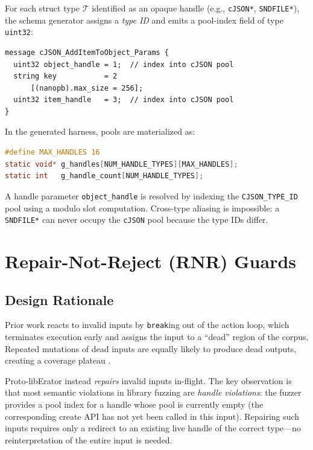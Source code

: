 \documentclass[sigconf,anonymous]{acmart}
\begin{document}
For each struct type $\mathcal{T}$ identified as an opaque handle
(e.g., \texttt{cJSON*}, \texttt{SNDFILE*}), the schema generator
assigns a \emph{type ID} and emits a pool-index field of type
\texttt{uint32}:

\begin{lstlisting}[language={}]
message cJSON_AddItemToObject_Params {
  uint32 object_handle = 1;  // index into cJSON pool
  string key           = 2
      [(nanopb).max_size = 256];
  uint32 item_handle   = 3;  // index into cJSON pool
}
\end{lstlisting}

In the generated harness, pools are materialized as:

\begin{lstlisting}[language=C, caption={Typed handle pool structure.}]
#define MAX_HANDLES 16
static void* g_handles[NUM_HANDLE_TYPES][MAX_HANDLES];
static int   g_handle_count[NUM_HANDLE_TYPES];
\end{lstlisting}

A handle parameter \texttt{object\_handle} is resolved by indexing the
\texttt{CJSON\_TYPE\_ID} pool using a modulo slot computation.
Cross-type aliasing is impossible: a \texttt{SNDFILE*} can never occupy
the \texttt{cJSON} pool because the type IDs differ.

\section{Repair-Not-Reject (RNR) Guards}
\label{sec:guards}

\subsection{Design Rationale}

Prior work reacts to invalid inputs by \texttt{break}ing out of the
action loop, which terminates execution early and assigns the input to a
``dead'' region of the corpus.  Repeated mutations of dead inputs are
equally likely to produce dead outputs, creating a coverage plateau
\cite{mopt_usenix19}.

Proto-libErator instead \emph{repairs} invalid inputs in-flight.  The
key observation is that most semantic violations in library fuzzing are
\emph{handle violations}: the fuzzer provides a pool index for a handle
whose pool is currently empty (the corresponding create API has not yet
been called in this input).  Repairing such inputs requires only a
redirect to an existing live handle of the correct type---no
reinterpretation of the entire input is needed.
\end{document}
